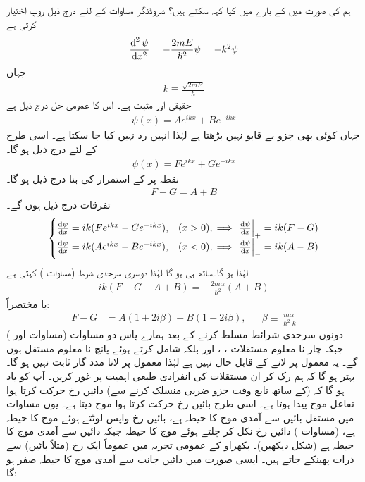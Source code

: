 ہم   کی صورت میں  کے بارے میں کیا کہہ سکتے ہیں؟ شروڈنگر مساوات  کے لئے  درج ذیل روپ اختیار کرتی ہے
\begin{align*}
\frac{\dif^{\,2}\psi}{\dif x^2}=-\frac{2mE}{\hslash^2}\psi=-k^2\psi
\end{align*}
 جہاں
\begin{align}\label{مساوات_شروڈنگر_مستقل_کے}
k\equiv\frac{\sqrt{2mE}}{\hslash}
\end{align}
 حقیقی اور مثبت ہے۔ اس کا عمومی حل  درج ذیل ہے
\begin{align}\label{مساوات_شروڈنگر_بایاں_حل_ڈیلٹا}
\psi(x)=Ae^{ikx}+Be^{-ikx}
\end{align}
جہاں کوئی بھی جزو بے قابو نہیں بڑھتا ہے لہٰذا انہیں رد نہیں کیا جا سکتا ہے۔ اسی طرح  کے لئے درج ذیل ہو گا۔
\begin{align}\label{مساوات_شروڈنگر_دایاں_حل_ڈیلٹا}
\psi(x)=Fe^{ikx}+Ge^{-ikx}
\end{align}
نقطہ  پر  کے استمرار کی بنا درج ذیل ہو گا۔
\begin{align}\label{مساوات_شروڈنگر_شرط_اول}
F+G=A+B
\end{align}
تفرقات درج ذیل ہوں گے۔
\begin{align*}
\begin{cases}
\frac{\dif\psi}{\dif x}=ik(Fe^{ikx}-Ge^{-ikx}),& (x>0),\implies \left.\frac{\dif\psi}{\dif x}\right|_{+}=ik(F-G)\\
\frac{\dif\psi}{\dif x}=ik(Ae^{ikx}-Be^{-ikx}),& (x<0),\implies \left.\frac{\dif\psi}{\dif x}\right|_{-}=ik(A-B)
\end{cases}
\end{align*}
لہٰذا  ہو گا۔ساتھ ہی  ہو گا لہٰذا دوسری سرحدی شرط (مساوات ) کہتی ہے
\begin{align}
ik(F-G-A+B)=-\frac{2m\alpha}{\hslash^2}(A+B)
\end{align}
یا مختصراً:
\begin{align}\label{مساوات_شروڈنگر_شرط_دوم}
F-G&=A(1+2i\beta)-B(1-2i\beta),&&\beta\equiv\frac{m\alpha}{\hslash^2 k}
\end{align}
دونوں سرحدی شرائط مسلط کرنے کے بعد ہمارے پاس دو مساوات (مساوات  اور ) جبکہ چار نا معلوم مستقلات ، ،  اور  بلکہ  شامل کرتے ہوئے پانچ نا معلوم مستقل ہوں گے۔ یہ معمول پر لانے کے قابل حال نہیں ہے لہٰذا معمول پر لانا مدد گار ثابت نہیں ہو گا۔ بہتر ہو گا کہ ہم رک کر ان  مستقلات کی انفرادی طبعی اہمیت پر غور کریں۔  آپ کو یاد ہو گا کہ  (کے ساتھ  تابع وقت جزو ضربی  منسلک کرنے سے) دائیں رخ حرکت کرتا ہوا تفاعل موج پیدا ہوتا ہے۔ اسی طرح  بائیں رخ حرکت کرتا ہوا موج دیتا ہے۔ یوں مساوات  میں مستقل  بائیں سے آمدی موج کا حیطہ ہے،  بائیں رخ واپس لوٹتے ہوئے موج کا حیطہ ہے،  (مساوات ) دائیں رخ نکل کر چلتے ہوئے موج کا حیطہ  جبکہ  دائیں سے آمدی موج کا حیطہ ہے (شکل  دیکھیں)۔ بکھراو کے عمومی تجربہ میں عموماً ایک رخ (مثلاً بائیں) سے ذرات پھینکے جاتے ہیں۔ ایسی صورت میں دائیں جانب سے آمدی موج کا حیطہ صفر ہو گا:
